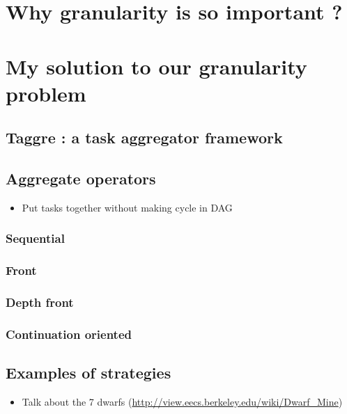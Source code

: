 \documentclass[oneside,12t]{classes/Thesis}
\begin{document}
\section{Why granularity is so important ?}




\section{My solution to our granularity problem}
\subsection{Taggre : a task aggregator framework}
\subsection{Aggregate operators}
  \begin{itemize}
    \item Put tasks together without making cycle in DAG
  \end{itemize}
\subsubsection{Sequential}
\subsubsection{Front}
\subsubsection{Depth front}
\subsubsection{Continuation oriented}
\subsection{Examples of strategies}
  \begin{itemize}
    \item Talk about the 7 dwarfs (\url{http://view.eecs.berkeley.edu/wiki/Dwarf_Mine})
  \end{itemize}
\end{document}
